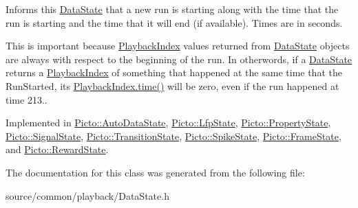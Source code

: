 Informs this \hyperlink{class_picto_1_1_data_state}{Data\-State} that a new run is starting along with the time that the run is starting and the time that it will end (if available). Times are in seconds. 

This is important because \hyperlink{struct_picto_1_1_playback_index}{Playback\-Index} values returned from \hyperlink{class_picto_1_1_data_state}{Data\-State} objects are always with respect to the beginning of the run. In otherwords, if a \hyperlink{class_picto_1_1_data_state}{Data\-State} returns a \hyperlink{struct_picto_1_1_playback_index}{Playback\-Index} of something that happened at the same time that the Run\-Started, its \hyperlink{struct_picto_1_1_playback_index_acbf8f826cfd64d647a098ed165dd3999}{Playback\-Index.\-time()} will be zero, even if the run happened at time 213.. 

Implemented in \hyperlink{class_picto_1_1_auto_data_state_aead300b3fb2e0064194091bc767a2fe7}{Picto\-::\-Auto\-Data\-State}, \hyperlink{class_picto_1_1_lfp_state_a87e3f6635bf617697b1de6a9113f0dfb}{Picto\-::\-Lfp\-State}, \hyperlink{class_picto_1_1_property_state_a737fa799240ff3025a8e6e1949d78fc6}{Picto\-::\-Property\-State}, \hyperlink{class_picto_1_1_signal_state_a9eb44b06fbfaf30a4be39c01af178bf0}{Picto\-::\-Signal\-State}, \hyperlink{class_picto_1_1_transition_state_ace615cb73cff5624ba1c276a04f464e1}{Picto\-::\-Transition\-State}, \hyperlink{class_picto_1_1_spike_state_a8ab8a7793a52c3aebbcd097ae1d060cb}{Picto\-::\-Spike\-State}, \hyperlink{class_picto_1_1_frame_state_a92287dfa13ac812fa3c5e652fb9f0799}{Picto\-::\-Frame\-State}, and \hyperlink{class_picto_1_1_reward_state_ac6bf96667f33664a7b5855b8098ed9f4}{Picto\-::\-Reward\-State}.



The documentation for this class was generated from the following file\-:\begin{DoxyCompactItemize}
\item 
source/common/playback/Data\-State.\-h\end{DoxyCompactItemize}
